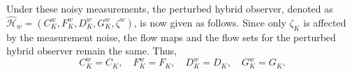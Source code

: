 \documentclass{article}
\begin{document}
Under these noisy measurements, the perturbed hybrid observer, denoted as $\hat{\mathcal{H}}_w = ({C}^w_K,{F}^w_K, {D}^w_K,  {G}^w_K, \zeta^w )$, is now given as follows. Since only $\zeta_K$ is affected by the measurement noise, the flow maps and the flow sets for the perturbed hybrid observer remain the same. Thus,
\[{C}^w_K = C_K, \quad {F}^w_K = F_K, \quad  {D}^w_K = D_K, \quad  {G}^w_K = G_K.\]





\end{document}
